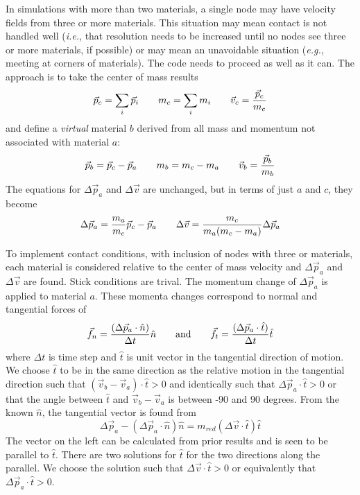 \documentclass[11pt]{article}
\begin{document}
In simulations with more than two materials, a single node may have velocity fields from three or more materials. This situation may mean contact is not handled well ({\em i.e.}, that resolution needs to be increased until no nodes see three or more materials, if possible) or may mean an unavoidable situation ({\em e.g.}, meeting at corners of materials). The code needs to proceed as well as it can. The approach is to take the center of mass results
\begin{equation}
     \vec p_c = \sum_i \vec p_i  \qquad m_c =  \sum_i m_i \qquad    \vec v_c = {\vec p_c\over m_c}
\end{equation}
and define a {\em virtual} material $b$ derived from all mass and momentum not associated with material $a$:
\begin{equation}
     \vec p_b = \vec p_c-\vec p_a  \qquad m_b = m_c - m_a \qquad    \vec v_b = {\vec p_b\over m_b}
\end{equation}
The equations for $\Delta \vec p_a$ and $\Delta \vec v$ are unchanged, but in terms of just $a$ and $c$, they become
\begin{equation}
    \Delta \vec p_a = {m_a\over m_c}\vec p_c-\vec p_a  \qquad \Delta \vec v = {m_c\over m_a(m_c-m_a)}\Delta \vec p_a
\end{equation}

To implement contact conditions, with inclusion of nodes with three or materials, each material is considered relative to the center of mass velocity and $\Delta \vec p_a$ and $\Delta \vec v$ are found. Stick conditions are trival. The momentum change of $\Delta \vec p_a$ is applied to material $a$. These momenta changes correspond to normal and tangential forces of
\begin{equation}
         \vec f_n = {(\Delta \vec p_a\cdot \hat n)\over \Delta t}\hat n \qquad {\rm and}\qquad \vec f_t={(\Delta \vec p_a\cdot \hat t)\over \Delta t}\hat t
\end{equation}
where $\Delta t$ is time step and $\hat t$ is unit vector in the tangential direction of motion. We choose $\hat t$ to be in the same direction as the relative motion in the tangential direction such that $(\vec v_b-\vec v_a)\cdot \hat t>0$ and identically such that $\Delta \vec p_a\cdot \hat t>0$ or that the angle between $\hat t$ and $\vec v_b-\vec v_a$ is between -90 and 90 degrees. From the known $\hat n$, the tangential vector is found from
\begin{equation}
          \Delta\vec p_a - (\Delta \vec p_a\cdot \hat n)\hat n = m_{red}(\Delta \vec v\cdot \hat t)\hat t
\end{equation}
The vector on the left can be calculated from prior results and is seen to be parallel to $\hat t$. There are two solutions for $\hat t$ for the two directions along the parallel. We choose the solution such that  $\Delta \vec v\cdot \hat t>0$ or equivalently that $\Delta \vec p_a\cdot \hat t>0$.
\end{document}

